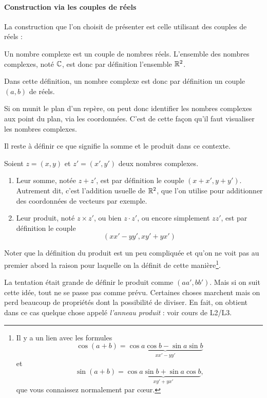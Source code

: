 \paragraph{Construction via les couples de réels}

La construction que l'on choisit de présenter est celle utilisant des couples de réels :

\begin{definition}
Un nombre complexe est un couple de nombres réels. L'ensemble des nombres complexes, noté $\mathbb{C}$, est donc par définition l'ensemble $\mathbb{R}^2$.
\end{definition}

Dans cette définition, un nombre complexe est donc par définition un couple $(a,b)$ de réels.

Si on munit le plan d'un repère, on peut donc identifier les nombres complexes aux point du plan, via les coordonnées. C'est de cette façon qu'il faut visualiser les nombres complexes.

 Il reste à définir ce que signifie la somme et le produit dans ce contexte.

\begin{definition}
Soient $z=(x,y)$ et $z'=(x',y')$ deux nombres complexes. 
\begin{enumerate}
\item Leur somme, notée $z+z'$, est par définition le couple $(x+x',y+y')$. Autrement dit, c'est l'addition usuelle de $\mathbb{R}^2$, que l'on utilise pour additionner des coordonnées de vecteurs par exemple.
\item Leur produit, noté $z\times z'$, ou bien $z\cdot z'$, ou encore simplement $zz'$, est par définition le couple
\[ (xx'-yy', xy'+yx')\]
\end{enumerate}
\end{definition}

Noter que la définition du produit est un peu compliquée et qu'on ne voit pas au premier abord la raison pour laquelle on la définit de cette manière\footnote{Il y a un lien avec les formules
\[ \cos(a+b)=\underbrace{\cos a\cos b - \sin a \sin b}_{xx'-yy'}\]
et 
\[ \sin(a+b) = \underbrace{\cos a \sin b + \sin a \cos b}_{xy'+yx'},\]
que vous connaissez normalement par c\oe ur.}.

\begin{remarque}
La tentation était grande de définir le produit comme $(aa', bb')$. Mais si on suit cette idée, tout ne se passe pas  comme prévu. Certaines choses marchent mais on perd beaucoup de propriétés dont la possibilité de diviser. En fait, on obtient dans ce cas quelque chose appelé \emph{l'anneau produit} : voir cours de L2/L3.
\end{remarque}

